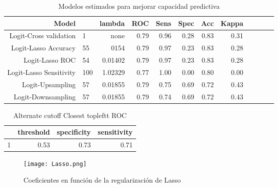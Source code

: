 \documentclass[11pt]{article}
\begin{document}
\begin{table}[ht]
\caption{Modelos estimados para mejorar capacidad predictiva} 
  \label{}
\centering
\begin{tabular}{rlrrrrrrrrrr}
  \hline
Model &  & lambda & ROC & Sens & Spec & Acc & Kappa \\ 
  \hline
Logit-Cross validation & 1 & none & 0.79 & 0.96 & 0.28 & 0.83 & 0.31  \\ 
Logit-Lasso Accuracy &  55 & 0154 & 0.79 & 0.97 & 0.23 & 0.83 & 0.28  \\ 
Logit-Lasso ROC & 54 & 0.01402 & 0.79 & 0.97 & 0.23 & 0.83 & 0.28  \\ 
Logit-Lasso Sensitivity & 100 & 1.02329 & 0.77 & 1.00 & 0.00 & 0.80 & 0.00 \\ 
Logit-Upsampling &  57 & 0.01855 & 0.79 & 0.75 & 0.69 & 0.72 & 0.43  \\ 
Logit-Downsampling &  57 & 0.01855 & 0.79 & 0.74 & 0.69 & 0.72 & 0.43 \\ 
   \hline
\end{tabular}
\end{table}

\begin{table}[ht]
\centering
\caption{Alternate cutoff Closest topleftt ROC}
\begin{tabular}{rrrr}
  \hline
 & threshold & specificity & sensitivity \\ 
  \hline
1 & 0.53 & 0.73 & 0.71 \\ 
   \hline
\end{tabular}
\end{table}


\begin{figure}[h]
\caption{Coeficientes en función de la regularización de Lasso}
\centering
\texttt{[image: Lasso.png]}

\end{figure}
\end{document}
